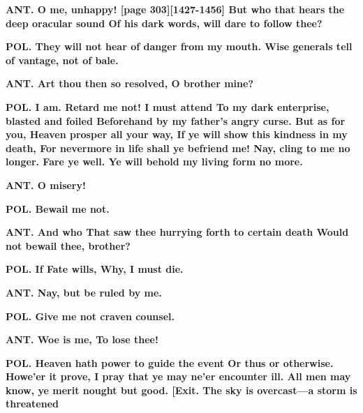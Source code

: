 \documentclass[11pt,letter]{book}
\begin{document}
\par \textbf{ANT. O me, unhappy! [page 303][1427-1456] But who that hears the deep oracular sound Of his dark words, will dare to follow thee?}
\par 

\par \textbf{POL. They will not hear of danger from my mouth. Wise generals tell of vantage, not of bale.}
\par 

\par \textbf{ANT. Art thou then so resolved, O brother mine?}
\par 

\par \textbf{POL. I am. Retard me not! I must attend To my dark enterprise, blasted and foiled Beforehand by my father’s angry curse. But as for you, Heaven prosper all your way, If ye will show this kindness in my death, For nevermore in life shall ye befriend me! Nay, cling to me no longer. Fare ye well. Ye will behold my living form no more.}
\par 

\par \textbf{ANT. O misery!}
\par 

\par \textbf{POL. Bewail me not.}
\par 

\par \textbf{ANT. And who That saw thee hurrying forth to certain death Would not bewail thee, brother?}
\par 

\par \textbf{POL. If Fate wills, Why, I must die.}
\par 

\par \textbf{ANT. Nay, but be ruled by me.}
\par 

\par \textbf{POL. Give me not craven counsel.}
\par 

\par \textbf{ANT. Woe is me, To lose thee!}
\par 

\par \textbf{POL. Heaven hath power to guide the event Or thus or otherwise. Howe’er it prove, I pray that ye may ne’er encounter ill. All men may know, ye merit nought but good. [Exit. The sky is overcast—a storm is threatened}
\par 
\end{document}
